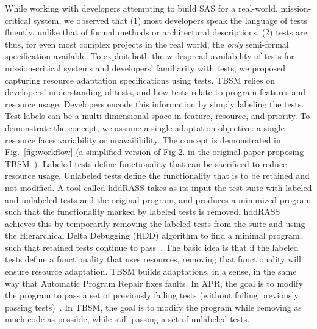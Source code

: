 While working with developers attempting to build SAS for a real-world, mission-critical system, we observed that (1) most developers speak the language of tests fluently, unlike that of formal methods or architectural descriptions,  (2) tests are thus, for even most complex projects in the real world, the \emph{only} semi-formal specification available. To exploit both the widespread availability of tests for mission-critical systems and developers' familiarity with tests, we proposed capturing resource adaptation specifications using tests.
TBSM relies on developers' understanding of tests, and how tests relate to program features and resource usage. Developers encode this information by simply labeling the tests. Test labels can be a multi-dimensional space in feature, resource, and priority. To demonstrate the concept, we assume a single adaptation objective: a single resource faces variability or unavailibility. The concept is demonstrated in Fig.~\ref{fig:workflow} (a simplified version of Fig 2. in the original paper proposing TBSM~\cite{christi2017saso}). Labeled tests define functionality that can be sacrificed to reduce resource usage. Unlabeled tests define the functionality that is to be retained and not modified. A tool called hddRASS takes as its input the test suite with labeled and unlabeled tests and the original program, and produces a minimized program such that the functionality marked by labeled tests is removed. hddRASS achieves this by temporarily removing the labeled tests from the suite and using the Hierarchical Delta Debugging (HDD) algorithm to find a minimal program, such that retained tests continue to pass~\cite{misherghi2006hdd}. The basic idea is that if the labeled tests define a functionality that uses resources, removing that functionality will ensure resource adaptation. TBSM builds adaptations, in a sense, in the same way that Automatic Program Repair fixes faults. In APR, the goal is to modify the program to pass a set of previously failing tests (without failing previously passing tests)~\cite{monperrus2018asr}. In TBSM, the goal is to modify the program while removing as much code as possible, while still passing a set of unlabeled tests.

